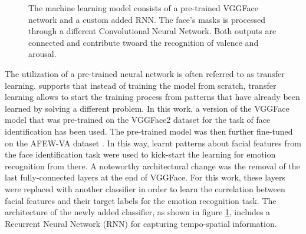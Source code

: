 \begin{figure}[H]
  \begin{center}
  \caption{The machine learning model consists of a pre-trained VGGFace network and a custom added RNN. The face's masks is processed through a different Convolutional Neural Network. Both outputs are connected and contribute twoard the recognition of valence and arousal.}
  \label{fig:MachineLearningModel}
  \end{center}
\end{figure}

The utilization of a pre-trained neural network is often referred to as transfer learning. \citet{Pedro:2018:TransferLearning} supports that instead of training the model from scratch, transfer learning allows to start the training process from patterns that have already been learned by solving a different problem.
\newline\newline
In this work, a version of the VGGFace model that was pre-trained on the VGGFace2 dataset \citep{Cao:2018:VGGFace2} for the task of face identification has been used. The pre-trained model was then further fine-tuned on the AFEW-VA dataset \citep{Kossaifi:2017:AFEW-VADatabase}. In this way, learnt patterns about facial features from the face identification task were used to kick-start the learning for emotion recognition from there. 
\newline\newline
A noteworthy architectural change was the removal of the last fully-connected layers at the end of VGGFace. For this work, these layers were replaced with another classifier in order to learn the correlation between facial features and their target labels for the emotion recognition task. The architecture of the newly added classifier, as shown in figure \ref{fig:MachineLearningModel}, includes a Recurrent Neural Network (RNN) for capturing tempo-spatial information.